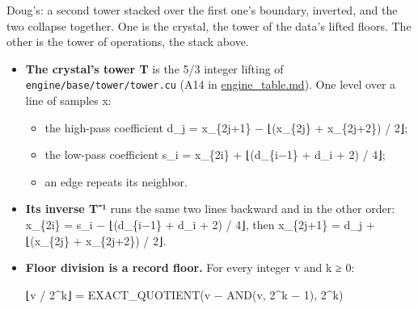 Doug's: a second tower stacked over the first one's boundary, inverted, and the two collapse together. One is the crystal, the tower of the data's lifted floors. The other is the tower of operations, the stack above.

\begin{itemize}
\item \textbf{The crystal's tower T} is the 5/3 integer lifting of \texttt{engine/\allowbreak{}base/\allowbreak{}tower/\allowbreak{}tower.\allowbreak{}cu} (A14 in \hyperref[chap:engine-table]{engine\_\allowbreak{}table.md}). One level over a line of samples x:

\begin{itemize}
\item the high-pass coefficient d\_\allowbreak{}j = x\_\allowbreak{}\{2j+1\} − ⌊(x\_\allowbreak{}\{2j\} + x\_\allowbreak{}\{2j+2\}) / 2⌋;
\item the low-pass coefficient s\_\allowbreak{}i = x\_\allowbreak{}\{2i\} + ⌊(d\_\allowbreak{}\{i−1\} + d\_\allowbreak{}i + 2) / 4⌋;
\item an edge repeats its neighbor.
\end{itemize}
\item \textbf{Its inverse T⁻¹} runs the same two lines backward and in the other order: x\_\allowbreak{}\{2i\} = s\_\allowbreak{}i − ⌊(d\_\allowbreak{}\{i−1\} + d\_\allowbreak{}i + 2) / 4⌋, then x\_\allowbreak{}\{2j+1\} = d\_\allowbreak{}j + ⌊(x\_\allowbreak{}\{2j\} + x\_\allowbreak{}\{2j+2\}) / 2⌋.
\item \textbf{Floor division is a record floor.} For every integer v and k ≥ 0:

⌊v / 2\textasciicircum{}k⌋ = EXACT\_\allowbreak{}QUOTIENT(v − AND(v, 2\textasciicircum{}k − 1), 2\textasciicircum{}k)


\end{itemize}
